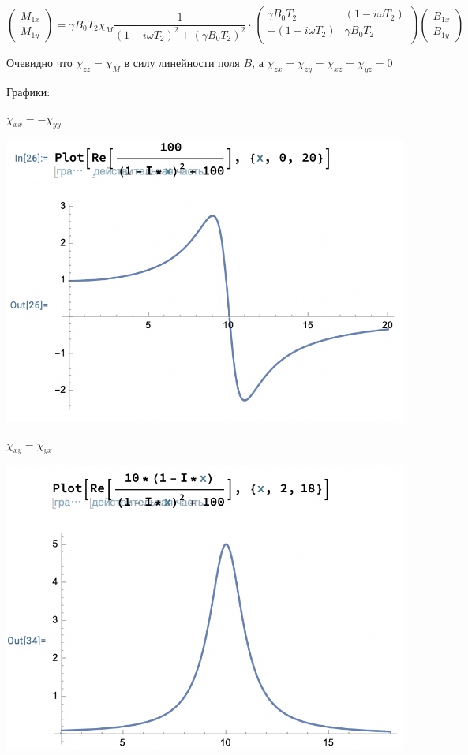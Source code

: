 \documentclass[12pt]{article}
\begin{document}
\begin{large}
\begin{equation*}
    \begin{pmatrix}
        M_{1x} \\
        M_{1y}
    \end{pmatrix}
    = \gamma B_0 T_2 \chi_M \frac{1}{\left( 1 -i\omega T_2 \right)^2 + \left( \gamma B_0 T_2 \right)^2} \cdot
    \begin{pmatrix}
         \gamma B_0 T_2 & \left( 1 -i\omega T_2 \right)\\
         - \left( 1 -i\omega T_2 \right) & \gamma B_0 T_2 \\
    \end{pmatrix}
    \begin{pmatrix}
        B_{1x} \\
        B_{1y}
    \end{pmatrix}
\end{equation*}
\par Очевидно что $\chi_{zz} = \chi_M$ в силу линейности поля $B$, а $\chi_{zx} = \chi_{zy} = \chi_{xz} = \chi_{yz} = 0$
\par Графики:
\par $\chi_{xx} = -\chi_{yy}$
\par
\includegraphics[width=1\textwidth]{photo_1.png}
\par $\chi_{xy} = \chi_{yx}$
\par
\includegraphics[width=1\textwidth]{photo_2.png}
\end{large}
\end{document}
